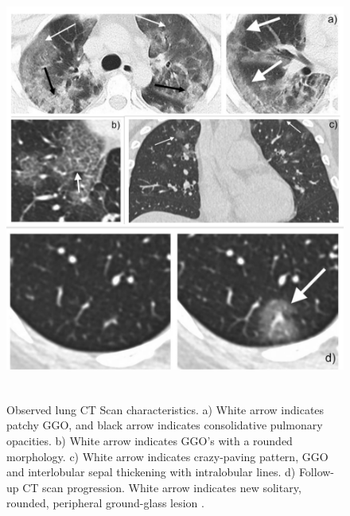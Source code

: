 \begin{figure}[H]
 \centering
 \includegraphics[width=15.5cm, height=14cm]{Images/CTScans2.jpg}
 \decoRule
 \caption[CT Scan Images]{Observed lung CT Scan characteristics. a) White arrow indicates patchy GGO, and black arrow indicates consolidative pulmonary opacities. b) White arrow indicates GGO's with a rounded morphology. c)  White arrow indicates crazy-paving pattern, GGO and interlobular sepal thickening with intralobular lines. d) Follow-up CT scan progression. White arrow indicates new solitary, rounded, peripheral ground-glass lesion \cite{CMA+2020}.}
 \label{fig:CT Scan Image 1}
 \end{figure}

        
